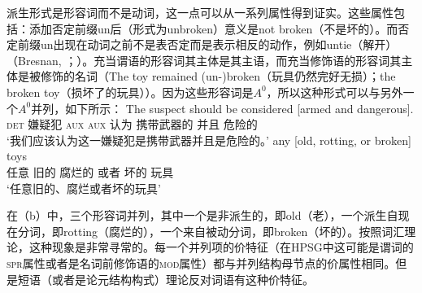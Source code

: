 \noindent
派生形式是形容词而不是动词，这一点可以从一系列属性得到证实。这些属性包括：添加否定前缀un后（形式为unbroken）意义是not broken（不是坏的）。而否定前缀un出现在动词之前不是表否定而是表示相反的动作，例如untie（解开）（Bresnan, \citeyear[]{Bresnan82a}；\citeyear[\S~3]{Bresnan2001a}）。充当谓语的形容词其主体是其主语，而充当修饰语的形容词其主体是被修饰的名词（The toy remained (un-)broken（玩具仍然完好无损）；the broken toy（损坏了的玩具））。因为这些形容词是$A^0$，所以这种形式可以与另外一个$A^0$并列，如下所示：
\eal
\ex 
\gll The suspect should be considered [armed and dangerous].\\
    \textsc{det} 嫌疑犯 \textsc{aux} \textsc{aux} 认为 携带武器的 并且 危险的\\
\glt `我们应该认为这一嫌疑犯是携带武器并且是危险的。' 
\ex 
\gll any [old, rotting, or broken] toys\\
    任意 \spacebr{}旧的 腐烂的 或者 坏的 玩具\\
\glt `任意旧的、腐烂或者坏的玩具' 
\zl

\noindent
在（b）中，三个形容词并列，其中一个是非派生的，即old（老），一个派生自现在分词，即rotting（腐烂的），一个来自被动分词，即broken（坏的）。按照词汇理论，这种现象是非常寻常的。每一个\azeroc 并列项的价特征（在HPSG中这可能是谓词的\textsc{spr}属性或者是名词前修饰语的\textsc{mod}属性）都与并列结构母节点的价属性相同。但是短语（或者是论元结构构式）理论反对词语有这种价特征。



